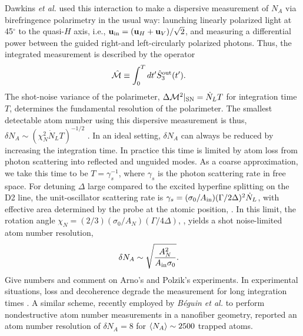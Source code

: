 \documentclass[preprint, aps,pra,onecolumn]{revtex4-1} %
\newcommand{\inp}{{\rm in}}
\newcommand{\shotnoise}{\Delta \mathcal{M}^2 |_{\rm SN}}
\newcommand{\chiN}{\chi_{N}}
\newcommand{\Abir}{A_N}
\newcommand{\comment}[1]{{\color{Maroon} #1}}
\begin{document}
Dawkins {\em et al.} \cite{dawkins_dispersive_2011} used this interaction to make a dispersive measurement of $N_A$ via birefringence polarimetry in the usual way: launching linearly polarized light at 45$^\circ$ to the quasi-$H$ axis, i.e., $\mbf{u}_\inp = (\mbf{u}_H + \mbf{u}_V )/\sqrt{2}$, and measuring  a differential power between the guided right-and left-circularly polarized photons. 
Thus, the integrated measurement is described by the operator
\begin{align} \label{Eq::MeasOpAtomCounting}
		\hat{\mathcal{M}} & \equiv \int_0^T dt' \hat{S}^{\rm out}_3(t').
\end{align} 
The shot-noise variance of the polarimeter, $\shotnoise =  \dot{N}_L T$ for integration time $T$,  determines the fundamental resolution of the polarimeter.  
The {\color{blue} smallest detectable atom number} using this dispersive measurement is thus, $\delta N_A \sim ( \chiN^2 \dot{N}_L T)^{-1/2}$ \cite{smith_faraday_2003}.  
In an ideal setting, $\delta N_A$ can always be reduced by increasing the integration time. In practice this time is limited by atom loss from photon scattering into reflected and unguided modes. 
As a coarse approximation, we take this time to be $T=\gamma_s^{-1}$, where $\gamma_s$ is the photon scattering rate in free space.  
For detuning $\Delta$ large compared to the excited hyperfine splitting on the D2 line, the unit-oscillator scattering rate is $\gamma_s =(\sigma_0 /A_{\rm in})(\Gamma/2 \Delta)^2 \dot{N}_L $, with effective area determined by the probe at the atomic position, .  
In this limit, the rotation angle $\chiN = (2/3) (\sigma_0/\Abir)(\Gamma/4\Delta)$, , yields a shot noise-limited atom number resolution, 
	\begin{align} \label{Eq::AtomNumberResolution}
		\delta N_A  &\sim \sqrt {\frac{\Abir^2}{A_{\rm in} \sigma_0}}.
	\end{align}
\comment{Give numbers and comment on Arno's and Polzik's experiments.} 
In experimental situations, loss and decoherence degrade the measurement for long integration times \cite{dawkins_dispersive_2011, zhang_collective_2012}. 
A similar scheme, recently employed by \emph{B\'{e}guin et al.} \cite{beguin_generation_2014} to perform nondestructive atom number measurements in a nanofiber geometry,  reported an atom number resolution of $\delta N_A = 8$ for $\langle{N_A}\rangle\sim2500$ trapped atoms.



\end{document}
